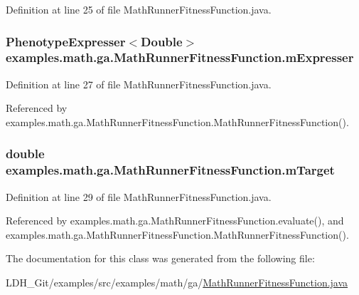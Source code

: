 Definition at line 25 of file Math\-Runner\-Fitness\-Function.\-java.

\hypertarget{classexamples_1_1math_1_1ga_1_1_math_runner_fitness_function_a3864f7417ea5dff701175b207520432c}{
\subsubsection[{m\-Expresser}]{\setlength{\rightskip}{0pt plus 5cm}Phenotype\-Expresser$<$Double$>$ examples.\-math.\-ga.\-Math\-Runner\-Fitness\-Function.\-m\-Expresser\hspace{0.3cm}{\ttfamily [private]}}}\label{classexamples_1_1math_1_1ga_1_1_math_runner_fitness_function_a3864f7417ea5dff701175b207520432c}


Definition at line 27 of file Math\-Runner\-Fitness\-Function.\-java.



Referenced by examples.\-math.\-ga.\-Math\-Runner\-Fitness\-Function.\-Math\-Runner\-Fitness\-Function().

\hypertarget{classexamples_1_1math_1_1ga_1_1_math_runner_fitness_function_a10d80f3ce2b42f38d9fc4101df62461e}{
\subsubsection[{m\-Target}]{\setlength{\rightskip}{0pt plus 5cm}double examples.\-math.\-ga.\-Math\-Runner\-Fitness\-Function.\-m\-Target\hspace{0.3cm}{\ttfamily [private]}}}\label{classexamples_1_1math_1_1ga_1_1_math_runner_fitness_function_a10d80f3ce2b42f38d9fc4101df62461e}


Definition at line 29 of file Math\-Runner\-Fitness\-Function.\-java.



Referenced by examples.\-math.\-ga.\-Math\-Runner\-Fitness\-Function.\-evaluate(), and examples.\-math.\-ga.\-Math\-Runner\-Fitness\-Function.\-Math\-Runner\-Fitness\-Function().



The documentation for this class was generated from the following file\-:\begin{DoxyCompactItemize}
\item 
L\-D\-H\-\_\-\-Git/examples/src/examples/math/ga/\hyperlink{_math_runner_fitness_function_8java}{Math\-Runner\-Fitness\-Function.\-java}\end{DoxyCompactItemize}
